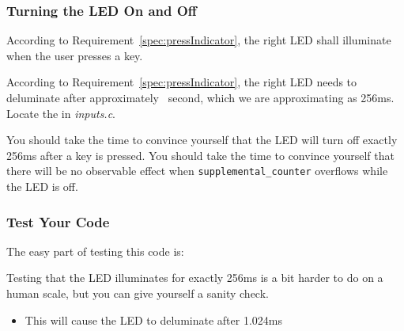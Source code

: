 \subsubsection{Turning the LED On and Off}

According to Requirement~\ref{spec:pressIndicator}, the right LED shall illuminate when the user presses a key.
\begin{description}
\end{description}

According to Requirement~\ref{spec:pressIndicator}, the right LED needs to deluminate after approximately \textonequarter\ second, which we are approximating as 256ms.
Locate the  in \textit{inputs.c}.

\begin{description}
\end{description}

You should take the time to convince yourself that the LED will turn off exactly 256ms after a key is pressed.
You should take the time to convince yourself that there will be no observable effect when \lstinline{supplemental_counter} overflows while the LED is off.


\subsubsection{Test Your Code}

The easy part of testing this code is:
\begin{description}
\end{description}

Testing that the LED illuminates for exactly 256ms is a bit harder to do on a human scale, but you can give yourself a sanity check.
\begin{description}
        \begin{itemize}
            \item This will cause the LED to deluminate after 1.024ms
        \end{itemize}
\end{description}

